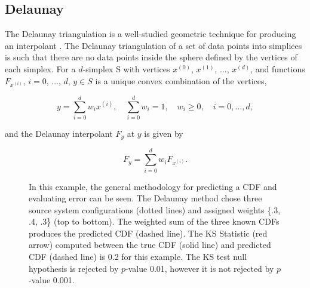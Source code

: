 \documentclass[letterpaper, 10 pt, conference]{ieeeconf}  %
\begin{document}
\subsection{Delaunay}
\label{sec:delaunay}

The Delaunay triangulation is a well-studied geometric technique for producing an interpolant \cite{lee1980two}. The Delaunay triangulation of a set of data points into simplices is such that there are no data points inside the sphere defined by the vertices of each simplex. For a $d$-simplex S with vertices $x^{(0)}$, $x^{(1)}$, $\ldots$, $x^{(d)}$, and functions $F_{x^{(i)}}$, $i=0$, $\ldots$, $d$, $y \in S$ is a unique convex combination of the vertices,

$$ y = \sum_{i=0}^{d} w_i x^{(i)}, \quad \sum_{i=0}^{d} w_i = 1, \quad w_i \geq 0, \quad i=0,\ldots,d, $$

and the Delaunay interpolant $F_y$ at $y$ is given by

$$ F_y = \sum_{i=0}^{d} w_i F_{x^{(i)}}. $$

\begin{figure}[htb]
  \vspace{-0.3cm}
  \caption{In this example, the general methodology for predicting a CDF and evaluating error can be seen. The Delaunay method chose three source system configurations (dotted lines) and assigned weights \{.3, .4, .3\} (top to bottom). The weighted sum of the three known CDFs produces the predicted CDF (dashed line). The KS Statistic (red arrow) computed between the true CDF (solid line) and predicted CDF (dashed line) is 0.2 for this example. The KS test null hypothesis is rejected by $p$-value 0.01, however it is not rejected by $p$-value 0.001.
  \vspace{-.1cm}}
  \label{fig:prediction_example}
\end{figure}
\end{document}
